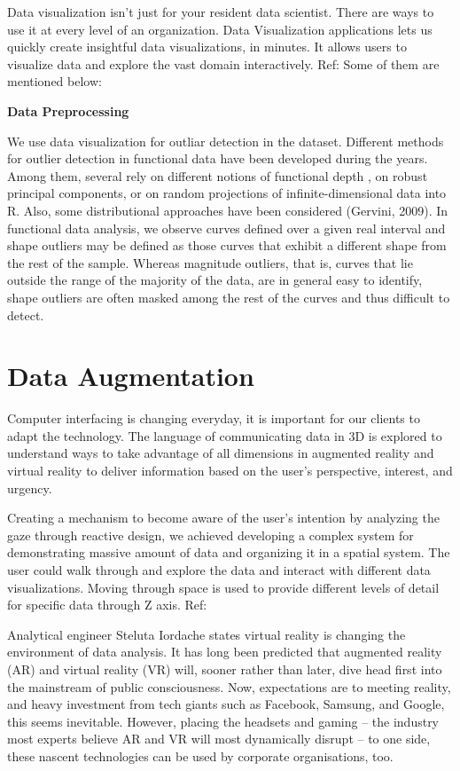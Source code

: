\documentclass[]{book}
\theoremstyle{definition}
\theoremstyle{definition}
\theoremstyle{definition}
\theoremstyle{remark}
\begin{document}
Data visualization isn't just for your resident data scientist. There
are ways to use it at every level of an organization. Data Visualization
applications lets us quickly create insightful data visualizations, in
minutes. It allows users to visualize data and explore the vast domain
interactively. Ref: \citep{app1} Some of them are mentioned below:

\textbf{Data Preprocessing}

We use data visualization for outliar detection in the dataset.
Different methods for outlier detection in functional data have been
developed during the years. Among them, several rely on different
notions of functional depth , on robust principal components, or on
random projections of infinite-dimensional data into R. Also, some
distributional approaches have been considered (Gervini, 2009). In
functional data analysis, we observe curves defined over a given real
interval and shape outliers may be defined as those curves that exhibit
a different shape from the rest of the sample. Whereas magnitude
outliers, that is, curves that lie outside the range of the majority of
the data, are in general easy to identify, shape outliers are often
masked among the rest of the curves and thus difficult to detect.

\citep{outliar}

\section{Data Augmentation}\label{data-augmentation}

Computer interfacing is changing everyday, it is important for our
clients to adapt the technology. The language of communicating data in
3D is explored to understand ways to take advantage of all dimensions in
augmented reality and virtual reality to deliver information based on
the user's perspective, interest, and urgency.

Creating a mechanism to become aware of the user's intention by
analyzing the gaze through reactive design, we achieved developing a
complex system for demonstrating massive amount of data and organizing
it in a spatial system. The user could walk through and explore the data
and interact with different data visualizations. Moving through space is
used to provide different levels of detail for specific data through Z
axis. Ref: \citep{ref_pdf_ar}

Analytical engineer Steluta Iordache states virtual reality is changing
the environment of data analysis. It has long been predicted that
augmented reality (AR) and virtual reality (VR) will, sooner rather than
later, dive head first into the mainstream of public consciousness. Now,
expectations are to meeting reality, and heavy investment from tech
giants such as Facebook, Samsung, and Google, this seems inevitable.
However, placing the headsets and gaming -- the industry most experts
believe AR and VR will most dynamically disrupt -- to one side, these
nascent technologies can be used by corporate organisations, too.
\end{document}
